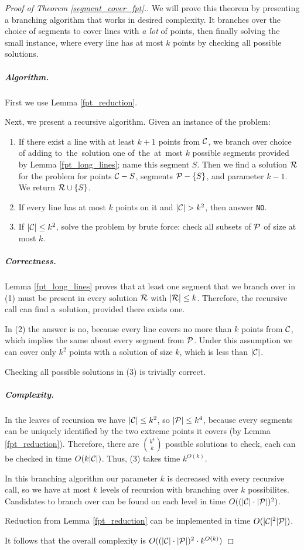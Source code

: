 \begin{proof}[Proof of Theorem \ref{segment_cover_fpt}.]\leavevmode

We will prove this theorem by presenting a branching algorithm that
works in desired complexity. It branches over the
choice of segments to cover lines with \textit{a lot} of points,
then finally solving the small instance, where
every line has at most $k$ points by checking all possible solutions.

\subparagraph{Algorithm.}
First we use Lemma \ref{fpt_reduction}.

Next, we present a recursive algorithm. Given an instance of the problem:

\begin{enumerate}[label={(\arabic*)}]
\item If there exist a line with at least $k+1$ points from $\mathcal{C}$,
we branch over choice of adding to~the~solution one of~the~at~most $k$ possible segments
provided by Lemma \ref{fpt_long_lines}; name this segment $S$.
Then we find a solution $\mathcal{R}$
for the problem for points $\mathcal{C} - S$, segments $\mathcal{P} - \{S\}$,
and parameter $k-1$. We return $\mathcal{R} \cup \{S\}$.
\item If every line has at most $k$ points on it and $|\mathcal{C}| > k^2$,
then answer \texttt{NO}.
\item If $|\mathcal{C}| \le k^2$, solve the problem by brute force:
check all subsets of $\mathcal{P}$ of size at most $k$.
\end{enumerate}

\subparagraph{Correctness.}

Lemma \ref{fpt_long_lines} proves that at least one segment that we
branch over in (1) must be present in every solution $\mathcal{R}$ with $|\mathcal{R}| \le k$.
Therefore, the recursive call can find a~solution, provided there exists one.

In (2) the answer is no, because every line covers no more than $k$ points
from $\mathcal{C}$, which implies the same about every segment from $\mathcal{P}$.
Under this assumption
we can cover only $k^2$ points with a solution of size $k$, which is less
than $|\mathcal{C}|$.

Checking all possible solutions in (3) is trivially correct.


\subparagraph{Complexity.}

In the leaves of recursion we have $|\mathcal{C}| \le k^2$, so $|\mathcal{P}| \le k^4$, because
every segments can be uniquely identified by the two extreme points it covers
(by Lemma \ref{fpt_reduction}). Therefore, there are $\binom{k^4}{k}$
possible solutions to check, each can be checked in time $O(k|\mathcal{C}|)$.
Thus, (3) takes time $k^{O(k)}$.


In this branching algorithm our parameter $k$ is decreased with every
recursive call, so we have at most $k$ levels of recursion with
branching over $k$ possibilites. Candidates to branch over
can be found on each level in time $O((|\mathcal{C}|\cdot|\mathcal{P}|)^2)$.

Reduction from Lemma \ref{fpt_reduction} can be implemented in time $O(|\mathcal{C}|^2|\mathcal{P}|)$.

It follows that the overall complexity is $O((|\mathcal{C}|\cdot|\mathcal{P}|)^2 \cdot k^{O(k)})$
\end{proof}

